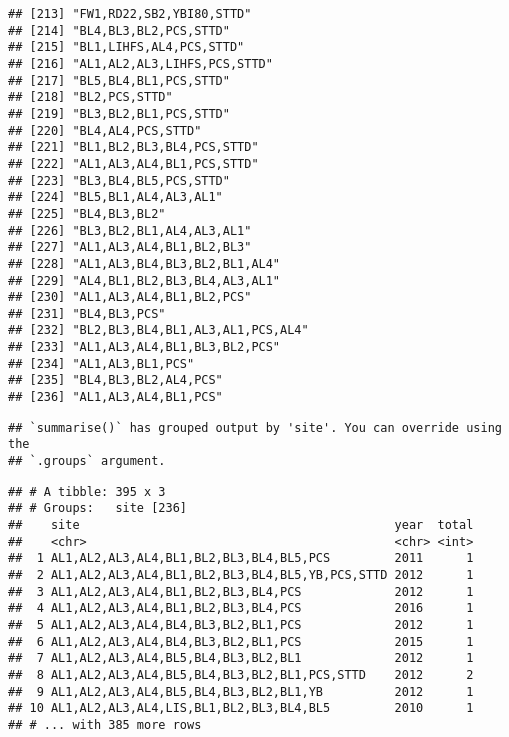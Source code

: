 \documentclass[
]{article}
\begin{document}
\begin{verbatim}
## [213] "FW1,RD22,SB2,YBI80,STTD"                         
## [214] "BL4,BL3,BL2,PCS,STTD"                            
## [215] "BL1,LIHFS,AL4,PCS,STTD"                          
## [216] "AL1,AL2,AL3,LIHFS,PCS,STTD"                      
## [217] "BL5,BL4,BL1,PCS,STTD"                            
## [218] "BL2,PCS,STTD"                                    
## [219] "BL3,BL2,BL1,PCS,STTD"                            
## [220] "BL4,AL4,PCS,STTD"                                
## [221] "BL1,BL2,BL3,BL4,PCS,STTD"                        
## [222] "AL1,AL3,AL4,BL1,PCS,STTD"                        
## [223] "BL3,BL4,BL5,PCS,STTD"                            
## [224] "BL5,BL1,AL4,AL3,AL1"                             
## [225] "BL4,BL3,BL2"                                     
## [226] "BL3,BL2,BL1,AL4,AL3,AL1"                         
## [227] "AL1,AL3,AL4,BL1,BL2,BL3"                         
## [228] "AL1,AL3,BL4,BL3,BL2,BL1,AL4"                     
## [229] "AL4,BL1,BL2,BL3,BL4,AL3,AL1"                     
## [230] "AL1,AL3,AL4,BL1,BL2,PCS"                         
## [231] "BL4,BL3,PCS"                                     
## [232] "BL2,BL3,BL4,BL1,AL3,AL1,PCS,AL4"                 
## [233] "AL1,AL3,AL4,BL1,BL3,BL2,PCS"                     
## [234] "AL1,AL3,BL1,PCS"                                 
## [235] "BL4,BL3,BL2,AL4,PCS"                             
## [236] "AL1,AL3,AL4,BL1,PCS"
\end{verbatim}

\begin{verbatim}
## `summarise()` has grouped output by 'site'. You can override using the
## `.groups` argument.
\end{verbatim}

\begin{verbatim}
## # A tibble: 395 x 3
## # Groups:   site [236]
##    site                                            year  total
##    <chr>                                           <chr> <int>
##  1 AL1,AL2,AL3,AL4,BL1,BL2,BL3,BL4,BL5,PCS         2011      1
##  2 AL1,AL2,AL3,AL4,BL1,BL2,BL3,BL4,BL5,YB,PCS,STTD 2012      1
##  3 AL1,AL2,AL3,AL4,BL1,BL2,BL3,BL4,PCS             2012      1
##  4 AL1,AL2,AL3,AL4,BL1,BL2,BL3,BL4,PCS             2016      1
##  5 AL1,AL2,AL3,AL4,BL4,BL3,BL2,BL1,PCS             2012      1
##  6 AL1,AL2,AL3,AL4,BL4,BL3,BL2,BL1,PCS             2015      1
##  7 AL1,AL2,AL3,AL4,BL5,BL4,BL3,BL2,BL1             2012      1
##  8 AL1,AL2,AL3,AL4,BL5,BL4,BL3,BL2,BL1,PCS,STTD    2012      2
##  9 AL1,AL2,AL3,AL4,BL5,BL4,BL3,BL2,BL1,YB          2012      1
## 10 AL1,AL2,AL3,AL4,LIS,BL1,BL2,BL3,BL4,BL5         2010      1
## # ... with 385 more rows
\end{verbatim}
\end{document}
